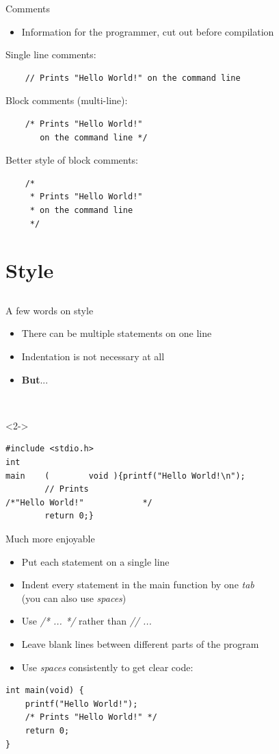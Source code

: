 \begin{frame}[fragile]{Comments}
	\begin{itemize}
		\item Information for the programmer, cut out before compilation
	\end{itemize}
	Single line comments:
	\begin{lstlisting}
	// Prints "Hello World!" on the command line
\end{lstlisting}
	Block comments (multi-line):
	\begin{lstlisting}
	/* Prints "Hello World!"
	   on the command line */
\end{lstlisting}
	Better style of block comments:
	\begin{lstlisting}
	/*
	 * Prints "Hello World!"
	 * on the command line
	 */
\end{lstlisting}
\end{frame}
\section{Style}
\subsection{}
\begin{frame}[fragile]{A few words on style}
	\begin{itemize}
		\item There can be multiple statements on one line
		\item Indentation is not necessary at all
		\item<2-> \textbf{But}...
	\end{itemize}
	\ \\
	\begin{uncoverenv}<2->
	\begin{lstlisting}[numbers=none]
#include <stdio.h>
int
main	(        void ){printf("Hello World!\n");
		// Prints
/*"Hello World!"			*/
		return 0;}
\end{lstlisting}
	\end{uncoverenv}
\end{frame}
\begin{frame}[fragile]{Much more enjoyable}
	\begin{itemize}
		\item Put each statement on a single line
		\item Indent every statement in the main function by one \textit{tab}\\
		 (you can also use \textit{spaces})
		\item Use \textit{/* ... */} rather than \textit{// ...}
		\item Leave blank lines between different parts of the program
		\item Use \textit{spaces} consistently to get clear code:
	\end{itemize}
	\begin{lstlisting}[numbers=none,showspaces=true,showtabs=true]
int main(void) {
	printf("Hello World!");
	/* Prints "Hello World!" */
	return 0;
}
\end{lstlisting}
\end{frame}



